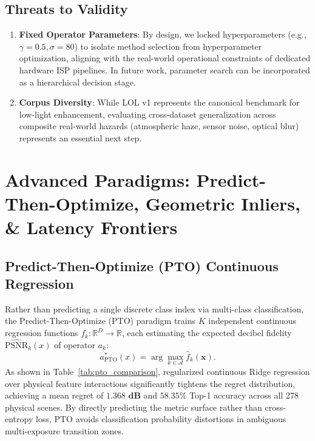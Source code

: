 \documentclass[journal]{IEEEtran}
\begin{document}
\subsection{Threats to Validity}
\begin{enumerate}
    \item \textbf{Fixed Operator Parameters}: By design, we locked hyperparameters (e.g., $\gamma=0.5, \sigma=80$) to isolate method selection from hyperparameter optimization, aligning with the real-world operational constraints of dedicated hardware ISP pipelines. In future work, parameter search can be incorporated as a hierarchical decision stage.
    \item \textbf{Corpus Diversity}: While LOL v1 represents the canonical benchmark for low-light enhancement, evaluating cross-dataset generalization across composite real-world hazards (atmospheric haze, sensor noise, optical blur) represents an essential next step.
\end{enumerate}

\section{Advanced Paradigms: Predict-Then-Optimize, Geometric Inliers, \& Latency Frontiers}

\subsection{Predict-Then-Optimize (PTO) Continuous Regression}
Rather than predicting a single discrete class index via multi-class classification, the Predict-Then-Optimize (PTO) paradigm trains $K$ independent continuous regression functions $f_k: \mathbb{R}^D \to \mathbb{R}$, each estimating the expected decibel fidelity $\widehat{\text{PSNR}}_k(x)$ of operator $a_k$:
\begin{equation}
a_{\text{PTO}}^*(x) = \arg\max_{k \in \mathcal{A}} \hat{f}_k(\mathbf{x}).
\end{equation}
As shown in Table~\ref{tab:pto_comparison}, regularized continuous Ridge regression over physical feature interactions significantly tightens the regret distribution, achieving a mean regret of $\mathbf{1.368\text{ dB}}$ and $58.35\%$ Top-1 accuracy across all 278 physical scenes. By directly predicting the metric surface rather than cross-entropy loss, PTO avoids classification probability distortions in ambiguous multi-exposure transition zones.
\end{document}
